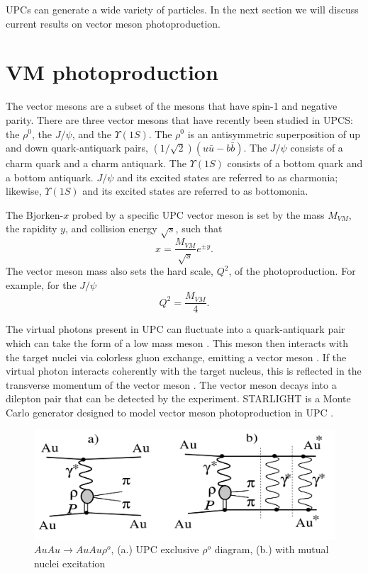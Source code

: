 UPCs can generate a wide variety of particles. In the next section we will discuss current results on vector meson photoproduction.

\section{VM photoproduction}
The vector mesons are a subset of the mesons that have spin-1 and negative parity. There are three vector mesons that have recently been studied in UPCS: the $\rho^0$, the $J/\psi$, and the $\Upsilon(1S)$. The $\rho^0$ is an antisymmetric superposition of up and down quark-antiquark pairs, $(1/\sqrt{2})(u\bar{u}-b\bar{b})$. The $J/\psi$ consists of a charm quark and a charm antiquark. The $\Upsilon(1S)$ consists of a bottom quark and a bottom antiquark. $J/\psi$ and its excited states are referred to as charmonia; likewise, $\Upsilon(1S)$ and its excited states are referred to as bottomonia.

The Bjorken-$x$ probed by a specific UPC vector meson is set by the mass $M_{VM}$, the rapidity $y$, and collision energy $\sqrt{s}$, such that
\begin{equation}
x = \frac{M_{VM}}{\sqrt{s}}e^{\pm y}.
\end{equation} The vector meson mass also sets the hard scale, $Q^2$, of the photoproduction. For example, for the $J/\psi$
\begin{equation}
Q^2 = \frac{M_{VM}}{4}.
\end{equation}

The virtual photons present in UPC can fluctuate into a quark-antiquark pair which can take the form of a low mass meson \cite{lta2011.09,Chekanov:2002xi,Klasen:2007pm}. This meson then interacts with the target nuclei via colorless gluon exchange, emitting a vector meson \cite{Emling:1994gu,dePassos:2001dc,Ryskin:1992ui,Goldhaber:1948zza}. If the virtual photon interacts coherently with the target nucleus, this is reflected in the transverse momentum of the vector meson \cite{Goncalves:2011vf}. The vector meson decays into a dilepton pair that can be detected by the experiment. STARLIGHT is a Monte Carlo generator designed to model vector meson photoproduction in UPC \cite{starlight}.

\begin{figure}[h!]
\begin{centering}
\includegraphics[width=5.5in]{Chapter2/importfigs/upc_star_diagram.png}
\par\end{centering}
\caption{$AuAu \rightarrow AuAu\rho^o$, (a.) UPC exclusive $\rho^o$ diagram, (b.) with mutual nuclei excitation \cite{Adler:2002sc} \label{fig:upcRhoStar}}
\end{figure}

